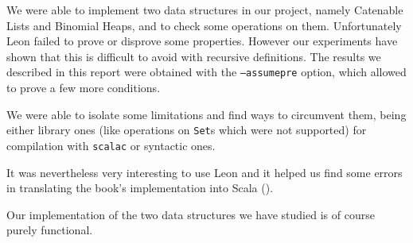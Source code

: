 We were able to implement two data structures in our project,
namely Catenable Lists and Binomial Heaps,
and to check some operations on them.
Unfortunately Leon failed to prove or disprove some properties. 
However our experiments have shown 
that this is difficult to avoid with recursive definitions.
The results we described in this report were obtained with the \texttt{--assumepre} option,
which allowed to prove a few more conditions.

We were able to isolate some limitations and find ways to circumvent them, 
being either library ones (like operations on \texttt{Set}s which were not supported) for compilation with \texttt{scalac}
or syntactic ones.

It was nevertheless very interesting to use Leon and it helped us find some errors 
in translating the book's implementation into Scala (\citep{Okasaki}). 

Our implementation of the two data structures we have studied is of course purely functional.